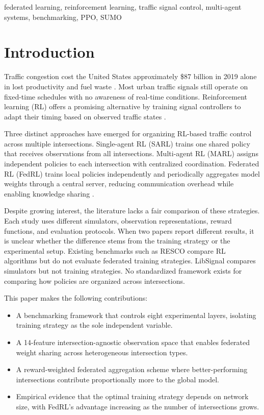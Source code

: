 \documentclass[conference]{IEEEtran}
\begin{document}
\begin{IEEEkeywords}
federated learning, reinforcement learning, traffic signal control, multi-agent systems, benchmarking, PPO, SUMO
\end{IEEEkeywords}

\section{Introduction}

Traffic congestion cost the United States approximately \$87 billion in 2019 alone in lost productivity and fuel waste \cite{b_inrix}. Most urban traffic signals still operate on fixed-time schedules with no awareness of real-time conditions. Reinforcement learning (RL) offers a promising alternative by training signal controllers to adapt their timing based on observed traffic states \cite{b_wei_survey}.

Three distinct approaches have emerged for organizing RL-based traffic control across multiple intersections. Single-agent RL (SARL) trains one shared policy that receives observations from all intersections. Multi-agent RL (MARL) assigns independent policies to each intersection with centralized coordination. Federated RL (FedRL) trains local policies independently and periodically aggregates model weights through a central server, reducing communication overhead while enabling knowledge sharing \cite{b_fedlight, b_seal}.

Despite growing interest, the literature lacks a fair comparison of these strategies. Each study uses different simulators, observation representations, reward functions, and evaluation protocols. When two papers report different results, it is unclear whether the difference stems from the training strategy or the experimental setup. Existing benchmarks such as RESCO \cite{b_resco} compare RL algorithms but do not evaluate federated training strategies. LibSignal \cite{b_libsignal} compares simulators but not training strategies. No standardized framework exists for comparing how policies are organized across intersections.

This paper makes the following contributions:
\begin{itemize}
    \item A benchmarking framework that controls eight experimental layers, isolating training strategy as the sole independent variable.
    \item A 14-feature intersection-agnostic observation space that enables federated weight sharing across heterogeneous intersection types.
    \item A reward-weighted federated aggregation scheme where better-performing intersections contribute proportionally more to the global model.
    \item Empirical evidence that the optimal training strategy depends on network size, with FedRL's advantage increasing as the number of intersections grows.
\end{itemize}
\end{document}
